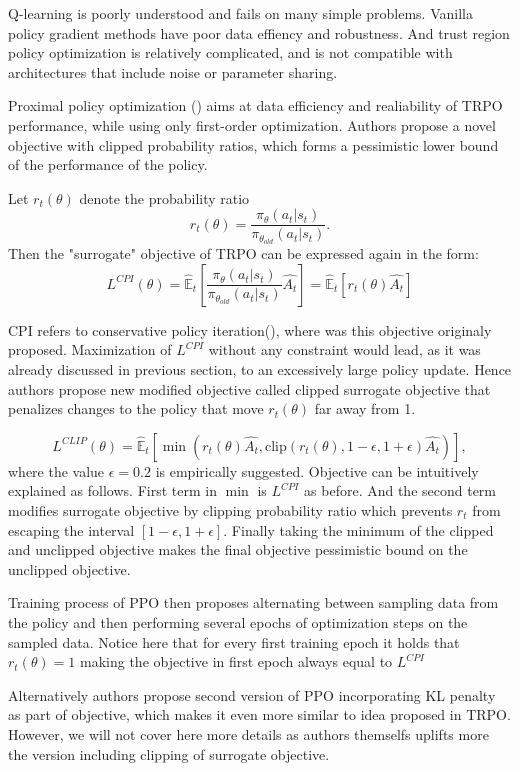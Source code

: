 Q-learning is poorly understood and fails on many simple problems.
Vanilla policy gradient methods have poor data effiency and robustness.
And trust region policy optimization is relatively complicated, and is not compatible with architectures that include noise or parameter sharing.

Proximal policy optimization (\cite{PPO}) aims at data efficiency and realiability of TRPO performance, while using only first-order optimization.
Authors propose a novel objective with clipped probability ratios, which forms a pessimistic lower bound of the performance of the policy.

Let $r_t(\theta)$ denote the probability ratio 
\[
  r_t(\theta) = \frac{\pi_\theta(a_t|s_t)}{\pi_{\theta_{old}}(a_t|s_t)}.
\]
Then the "surrogate" objective of TRPO can be expressed again in the form:
\[
  L^{CPI}(\theta)=\hat{\mathbb{E}}_t \left[ \frac{\pi_\theta(a_t|s_t)}{\pi_{\theta_{old}}(a_t|s_t)}\hat{A_t} \right] = \hat{\mathbb{E}}_t \left[ r_t(\theta) \hat{A_t}\right]   
\]

CPI refers to conservative policy iteration(\cite{CPI}), where was this objective originaly proposed.
Maximization of $L^{CPI}$ without any constraint would lead, as it was already discussed in previous section, to an excessively large policy update.
Hence authors propose new modified objective called clipped surrogate objective that penalizes changes to the policy that move $r_t(\theta)$ far away from 1.

\[
  L^{CLIP}(\theta) = \hat{\mathbb{E}}_t \left[ \min (r_t(\theta) \hat{A_t}, \textrm{clip} (r_t(\theta), 1-\epsilon, 1+\epsilon) \hat{A_t})\right],
\]
where the value $\epsilon = 0.2$ is empirically suggested. 
Objective can be intuitively explained as follows.
First term in $\min$ is $L^{CPI}$ as before.
And the second term modifies surrogate objective by clipping probability ratio which prevents $r_t$ from escaping the interval $[1-\epsilon, 1+ \epsilon]$.
Finally taking the minimum of the clipped and unclipped objective makes the final objective pessimistic bound on the unclipped objective.

Training process of PPO then proposes alternating between sampling data from the policy and then performing several epochs of optimization steps on the sampled data.
Notice here that for every first training epoch it holds that $r_t(\theta) = 1$ making the objective in first epoch always equal to $L^{CPI}$

Alternatively authors propose second version of PPO incorporating KL penalty as part of objective, which makes it even more similar to idea proposed in TRPO.
However, we will not cover here more details as authors themselfs uplifts more the version including clipping of surrogate objective.


